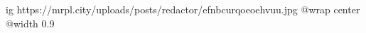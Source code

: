  
 
 
 
 

\ifcmt
  ig https://mrpl.city/uploads/posts/redactor/efnbcurqoeoehvuu.jpg
  @wrap center
  @width 0.9
\fi
